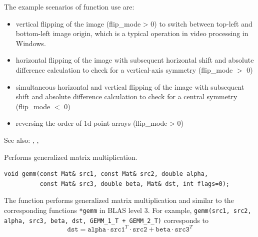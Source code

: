 The example scenarios of function use are:
\begin{itemize}
  \item vertical flipping of the image (flip\_mode > 0) to switch between top-left and bottom-left image origin, which is a typical operation in video processing in Windows.
  \item horizontal flipping of the image with subsequent horizontal shift and absolute difference calculation to check for a vertical-axis symmetry (flip\_mode $>$ 0)
  \item simultaneous horizontal and vertical flipping of the image with subsequent shift and absolute difference calculation to check for a central symmetry (flip\_mode $<$ 0)
  \item reversing the order of 1d point arrays (flip\_mode > 0)
\end{itemize}

See also: , , 

\label{gemm}
Performs generalized matrix multiplication.

\begin{lstlisting}
void gemm(const Mat& src1, const Mat& src2, double alpha,
          const Mat& src3, double beta, Mat& dst, int flags=0);
\end{lstlisting}
\begin{description}
\end{description}

The function performs generalized matrix multiplication and similar to the corresponding functions \texttt{*gemm} in BLAS level 3.
For example, \texttt{gemm(src1, src2, alpha, src3, beta, dst, GEMM\_1\_T + GEMM\_2\_T)} corresponds to
\[
\texttt{dst} = \texttt{alpha} \cdot \texttt{src1} ^T \cdot \texttt{src2} + \texttt{beta} \cdot \texttt{src3} ^T
\]

